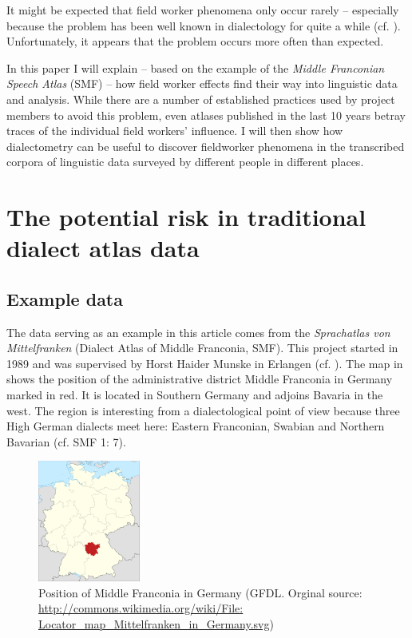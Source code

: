 \documentclass[output=paper]{LSP/langsci}
\begin{document}
It might be expected that field worker phenomena only occur rarely – especially because the problem has been well known in dialectology for quite a while (cf. \citealt[59--73]{hotzenkocherle_einfuhrung_1962}). Unfortunately, it appears that the problem occurs more often than expected.

In this paper I will explain – based on the example of the \textit{Middle Franconian Speech Atlas} (SMF) – how field worker effects find their way into linguistic data and analysis. While there are a number of established practices used by project members to avoid this problem, even atlases published in the last 10 years betray traces of the individual field workers' influence. I will then show how dialectometry can be useful to discover fieldworker phenomena in the transcribed corpora of linguistic data surveyed by different people in different places.

\section{The potential risk in traditional dialect atlas data}

\subsection{Example data}
The data serving as an example in this article comes from the \textit{Sprachatlas von Mittelfranken} (Dialect Atlas of Middle Franconia, SMF). This project started in 1989 and was supervised by Horst Haider Munske in Erlangen (cf. \citealt[11]{munske_zur_2013}). The map in  shows the position of the administrative district Middle Franconia in Germany marked in red. It is located in Southern Germany and adjoins Bavaria in the west. The region is interesting from a dialectological point of view because three High German dialects meet here: Eastern Franconian, Swabian and Northern Bavarian (cf. SMF 1: 7).

\begin{figure}
\includegraphics[width=0.3\textwidth]{illustrations/mathus_fig2}
\caption{Position of Middle Franconia in Germany (GFDL. Orginal source: \url{http://commons.wikimedia.org/wiki/File: Locator\_map\_Mittelfranken\_in\_Germany.svg})}
\label{fig:mathus:2}
\end{figure}
\end{document}
